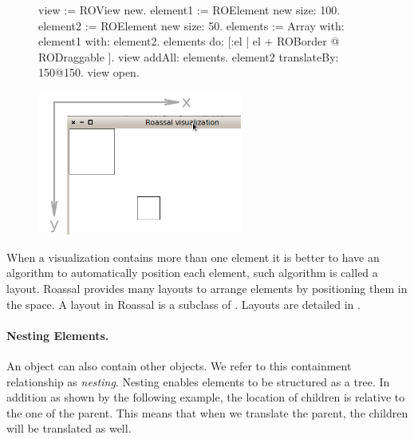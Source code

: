 \documentclass[a4paper,10pt,twoside]{book}
\begin{document}
\begin{figure}[H]
      \begin{minipage}[t]{0.5\textwidth}
      \vspace{0pt}
\begin{code}{}
view := ROView new.
element1 := ROElement new size: 100.
element2 := ROElement new size: 50.
elements := Array with: element1 with: element2.
elements do: [:el | el + ROBorder @ RODraggable ].
view addAll: elements.
element2 translateBy: 150@150.
view open.
\end{code}
   \end{minipage}
   \hfill
   \begin{minipage}[t]{0.6\textwidth}
      \vspace{0pt} \raggedright
       \centering
		\includegraphics[width=0.6\textwidth]{ex4}
   \end{minipage}
\label{fig:ex4}
\end{figure}


When a visualization contains more than one element it is better to have an algorithm to automatically position each element, such algorithm is called a layout. Roassal provides many layouts to arrange elements by positioning them in the space. A layout in Roassal is a subclass of . Layouts are detailed in .

\paragraph{Nesting Elements.}
An  object can also contain other  objects. We refer to this containment relationship as \emph{nesting}. Nesting enables elements to be structured as a tree. In addition as shown by the following example, the location of children is relative to the one of the parent. This means that when we translate the parent, the children will be translated as well. %
\end{document}
